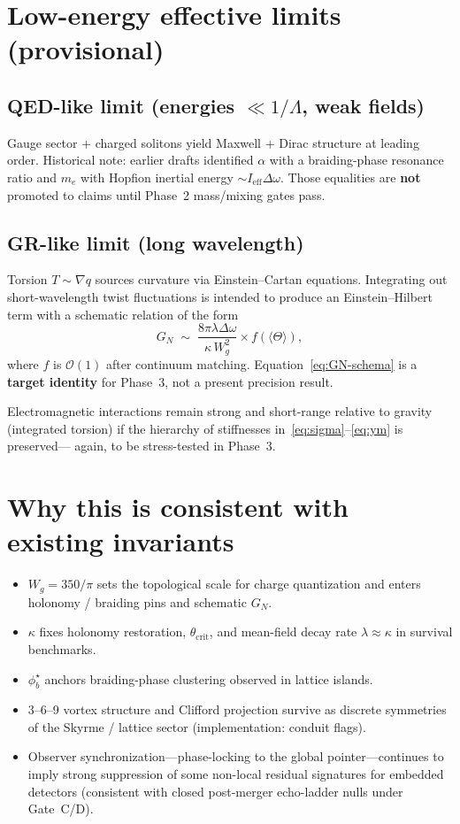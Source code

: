 \documentclass[11pt]{article}
\begin{document}
\section{Low-energy effective limits (provisional)}

\subsection{QED-like limit (energies $\ll 1/\Lambda$, weak fields)}
Gauge sector + charged solitons yield Maxwell + Dirac structure at leading order.
Historical note: earlier drafts identified $\alpha$ with a braiding-phase resonance ratio
and $m_e$ with Hopfion inertial energy $\sim I_{\mathrm{eff}}\Delta\omega$.
Those equalities are \textbf{not} promoted to claims until Phase~2 mass/mixing gates pass.

\subsection{GR-like limit (long wavelength)}
Torsion $T\sim\nabla q$ sources curvature via Einstein--Cartan equations. Integrating out
short-wavelength twist fluctuations is intended to produce an Einstein--Hilbert term with
a schematic relation of the form
\begin{equation}
G_N \;\sim\; \frac{8\pi\lambda\Delta\omega}{\kappa\,W_g^2}\times f(\langle\Theta\rangle),
\label{eq:GN-schema}
\end{equation}
where $f$ is $\mathcal{O}(1)$ after continuum matching. Equation~\eqref{eq:GN-schema} is a
\textbf{target identity} for Phase~3, not a present precision result.

Electromagnetic interactions remain strong and short-range relative to gravity (integrated
torsion) if the hierarchy of stiffnesses in~\eqref{eq:sigma}--\eqref{eq:ym} is preserved---
again, to be stress-tested in Phase~3.

\section{Why this is consistent with existing invariants}

\begin{itemize}
\item $W_g=350/\pi$ sets the topological scale for charge quantization and enters
  holonomy / braiding pins and schematic $G_N$.
\item $\kappa$ fixes holonomy restoration, $\theta_{\mathrm{crit}}$, and mean-field decay rate
  $\lambda\approx\kappa$ in survival benchmarks.
\item $\phi_b^\star$ anchors braiding-phase clustering observed in lattice islands.
\item 3--6--9 vortex structure and Clifford projection survive as discrete symmetries of
  the Skyrme / lattice sector (implementation: conduit flags).
\item Observer synchronization---phase-locking to the global pointer---continues to imply
  strong suppression of some non-local residual signatures for embedded detectors
  (consistent with closed post-merger echo-ladder nulls under Gate~C/D).
\end{itemize}
\end{document}

